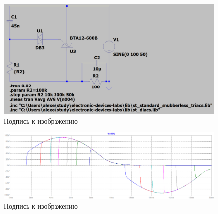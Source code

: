 \documentclass[a4paper, 12pt]{article}
\begin{document}
    \begin{figure}[H]
        \centering
        \includegraphics[scale=0.3]{scheme6.png}
        \captionsetup{skip=0pt}
        \caption{Подпись к изображению}
        \label{fig:scheme6}
    \end{figure}


    \begin{figure}[H]
        \centering
        \includegraphics[scale=0.45]{R2-all_C10u.png}
        \captionsetup{skip=0pt}
        \caption{Подпись к изображению}
        \label{fig:R2-all_C10u}
    \end{figure}
\end{document}
